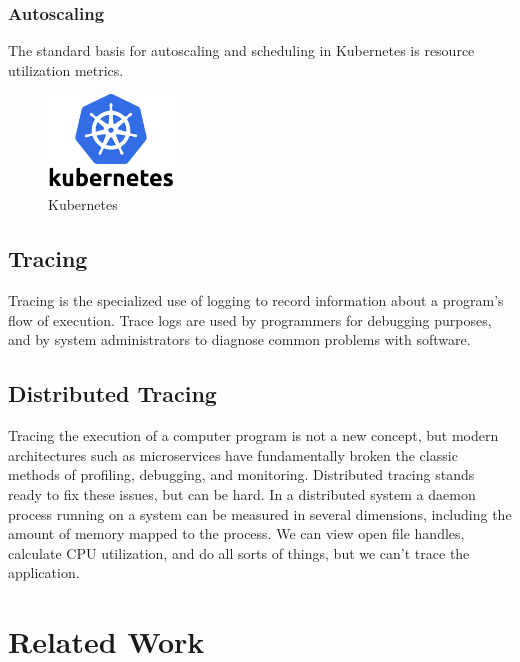 \documentclass[conference]{IEEEtran}
\begin{document}
\subsubsection{Autoscaling}
The standard basis for autoscaling and scheduling in Kubernetes is resource utilization metrics.
\begin{figure}
    \begin{center}
        \includegraphics[width=0.3\textwidth]{figures/kubernetes.png}
    \end{center}
    \caption{Kubernetes}
    \label{fig:Kubernetes}
\end{figure}

\subsection{Tracing}

Tracing is the specialized use of logging to record information about a program’s flow of execution.
Trace logs are used by programmers for debugging purposes, and by system administrators to diagnose common problems with software.

\subsection{Distributed Tracing}
                                                                                                                     Tracing the execution of a computer program is not a new concept, but modern architectures such as microservices have fundamentally broken the classic methods of profiling, debugging, and monitoring. Distributed tracing stands ready to fix these issues, but can be hard.
                                                                                                                     In a distributed system a daemon process running on a system can be measured in several dimensions, including the amount of memory mapped to the process. We can view open file handles, calculate CPU utilization, and do all sorts of things, but we can't trace the application.

\section{Related Work}
\end{document}
